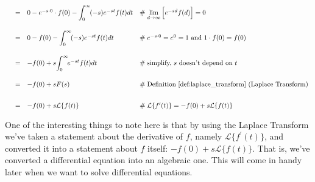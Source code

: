 \documentclass{article}
\theoremstyle{definition}
\begin{document}
\begin{equation*}
\begin{array}{lllll}
&=& 0  - e^{-s \cdot 0} \cdot f(0)  - \mathlarger{\int}^\infty_0 \!  (-s) e^{-st}  f(t) dt                                                                            &\mathrel{\#} \lim\limits_{d \to \infty}\Big [e^{-sd} f(d) \Big ] = 0                                 \\
[20pt]                                                                                                                                                                                                %
&=& 0 - f(0) - \mathlarger{\int}^\infty_0 \!  (-s) e^{-st}  f(t) dt                                                                                                             &\mathrel{\#} e^{-s \cdot 0} = e^0 = 1 \text{ and } 1 \cdot f(0) = f(0)                          \\
[20pt]                                                                                                                                                                                                %
&=& -f(0) + s \mathlarger{\int}^\infty_0 \!  e^{-st}  f(t) dt                                                                                                                    &\mathrel{\#} \text{simplify, $s$ doesn't depend on $t$}                                           \\
[20pt]                                                                                                                                                                                                 %
&=& -f(0) + s F(s)                                                                                                                                                                              &\mathrel{\#} \text{Definition \ref{def:laplace_transform} (Laplace Transform)}       \\   
[20pt]                                                                                                                                                                                                 %
&=& -f(0) + s \mathcal{L}\{f(t)\}                                                                                                                                                          &\mathrel{\#} \mathcal{L}\{f^\prime(t)\} = -f(0) + s \mathcal{L}\{f(t)\}                                           
\end{array}
\end{equation*}

\bigskip
\noindent
One of the interesting things to note here is that by using the Laplace Transform we've taken a statement about the derivative of $f$, namely $\mathcal{L}\{f^\prime(t)\}$,
and converted it into a statement about $f$ itself: $ -f(0) + s \mathcal{L}\{f(t)\} $. That is, we've converted a differential equation into an algebraic one. This will come in handy later 
when we want to solve differential equations.
\end{document}
